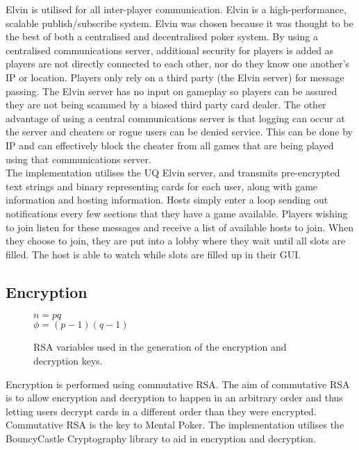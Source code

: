 \documentclass[11pt, oneside]{article}   	%
\begin{document}
Elvin is utilised for all inter-player communication. Elvin is a high-performance, scalable publish/subscribe system. Elvin was chosen because it was thought to be the best of both a centralised and decentralised poker system. By using a centralised communications server, additional security for players is added as players are not directly connected to each other, nor do they know one another's IP or location. Players only rely on a third party (the Elvin server) for message passing. The Elvin server has no input on gameplay so players can be assured they are not being scammed by a biased third party card dealer. The other advantage of using a central communications server is that logging can occur at the server and cheaters or rogue users can be denied service. This can be done by IP and can effectively block the cheater from all games that are being played using that communications server.\\

The implementation utilises the UQ Elvin server, and transmits pre-encrypted text strings and binary representing cards for each user, along with game information and hosting information. Hosts simply enter a loop sending out notifications every few sections that they have a game available. Players wishing to join listen for these messages and receive a list of available hosts to join. When they choose to join, they are put into a lobby where they wait until all slots are filled. The host is able to watch while slots are filled up in their GUI.

\subsection{Encryption}
\label{sec:encryption}

\begin{figure}[H]
	\caption{RSA variables used in the generation of the encryption and decryption keys.}
  	\centering
	$n=pq$\\$\phi=(p-1)(q-1)$
	\label{fig:rsavars}
\end{figure}

Encryption is performed using commutative RSA. The aim of commutative RSA is to allow encryption and decryption to happen in an arbitrary order and thus letting users decrypt cards in a different order than they were encrypted. Commutative RSA is the key to Mental Poker. The implementation utilises the BouncyCastle Cryptography library to aid in encryption and decryption.\\
\end{document}
